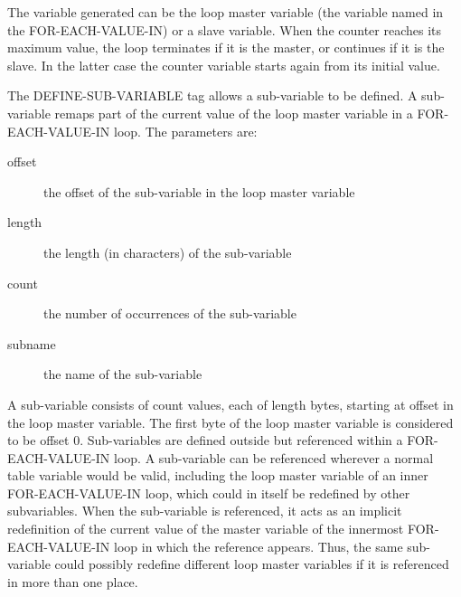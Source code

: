 \documentclass[letterpaper,10pt,english]{sphinxmanual}
\begin{document}
The variable generated can be the loop master variable (the variable named in the FOR-EACH-VALUE-IN) or a slave variable. When the counter reaches its maximum value, the loop terminates if it is the master, or continues if it is the slave. In the latter case the counter variable starts again from its initial value.


\begin{sphinxVerbatim}[commandchars=\\\{\}]
    
\end{sphinxVerbatim}

The DEFINE-SUB-VARIABLE tag allows a sub-variable to be defined. A sub-variable remaps part of the current value of the loop master variable in a FOR-EACH-VALUE-IN loop. The parameters are:
\begin{description}
\item[{offset}] \leavevmode
the offset of the sub-variable in the loop master variable

\item[{length}] \leavevmode
the length (in characters) of the sub-variable

\item[{count}] \leavevmode
the number of occurrences of the sub-variable

\item[{subname}] \leavevmode
the name of the sub-variable

\end{description}

A sub-variable consists of count values, each of length bytes, starting at offset in the loop master variable. The first
byte of the loop master variable is considered to be offset 0. Sub-variables are defined outside but referenced within a
FOR-EACH-VALUE-IN loop. A sub-variable can be referenced wherever a normal table variable would be valid, including
the loop master variable of an inner FOR-EACH-VALUE-IN loop, which could in itself be redefined by other subvariables.
When the sub-variable is referenced, it acts as an implicit redefinition of the current value of the master
variable of the innermost FOR-EACH-VALUE-IN loop in which the reference appears. Thus, the same sub-variable could
possibly redefine different loop master variables if it is referenced in more than one place.
\end{document}
